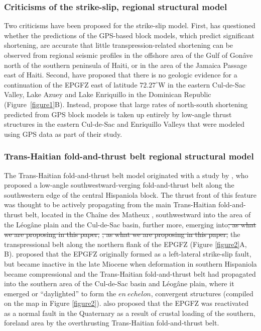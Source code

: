 \documentclass[linenumbers,draft]{agujournal}
\providecommand{\DIFadd}[1]{{\protect\color{blue}\uwave{#1}}} %
\providecommand{\DIFdel}[1]{{\protect\color{red}\sout{#1}}}                      %
\providecommand{\DIFaddbegin}{} %
\providecommand{\DIFaddend}{} %
\providecommand{\DIFdelbegin}{} %
\providecommand{\DIFdelend}{} %
\begin{document}
\subsubsection{Criticisms of the strike-slip, regional structural model}
Two criticisms have been proposed for the strike-slip model. First, \citet{corbeau2016transpressive} has questioned whether the predictions of the GPS-based block models, which predict significant shortening, are accurate that little transpression-related shortening can be observed from regional seismic profiles in the offshore area of the Gulf of Gon\^ave north of the southern peninsula of Haiti, or in the area of the Jamaica Passage east of Haiti. Second, \citet{symithe2016present} have proposed that there is no geologic evidence for a continuation of the EPGFZ east of latitude $72.27^{\circ}$W in the eastern Cul-de-Sac Valley, Lake Azuey and Lake Enriquillo in the Dominican Republic (Figure~\ref{figure1}B). Instead, \citet{symithe2016present} propose that large rates of north-south shortening predicted from GPS block models is taken up entirely by low-angle thrust structures in the eastern Cul-de-Sac and Enriquillo Valleys that were modeled using GPS data as part of their study.

\subsubsection{Trans-Haitian fold-and-thrust belt regional structural model}
The Trans-Haitian fold-and-thrust belt model originated with a study by \citet{pubellier2000plate}, who proposed a low-angle southwestward-verging fold-and-thrust belt along the southwestern edge of the central Hispaniola block. The thrust front of this feature was thought to be actively propagating from the main Trans-Haitian fold-and-thrust belt, located in the Cha\^ine des Matheux \DIFaddbegin \underline{\DIFadd{(Figure~\ref{figure1}B, Figure~\ref{figure2}A)}}\DIFaddend , southwestward into the area of the L\'eog\^ane plain and the Cul-de-Sac basin, further more, emerging into\DIFdelbegin \DIFdel{, as what we are proposing in this paper, }\DIFdelend \DIFaddbegin \st{, as what we are proposing in this paper,} \DIFaddend the transpressional belt along the northern flank of the EPGFZ (Figure \ref{figure2}A, B). \citet{pubellier2000plate} proposed that the EPGFZ originally formed as a left-lateral strike-slip fault, but became inactive in the late Miocene when deformation in southern Hispaniola became compressional and the Trans-Haitian fold-and-thrust belt had propagated into the southern area of the Cul-de-Sac basin and L\'eog\^ane plain, where it emerged or ``daylighted'' to form the $en~echelon$, convergent structures (compiled on the map in Figure \ref{figure2}). \citet{pubellier2000plate} also proposed that the EPGFZ was reactivated as a normal fault in the Quaternary as a result of crustal loading of the southern, foreland area by the overthrusting Trans-Haitian fold-and-thrust belt. 
\end{document}
